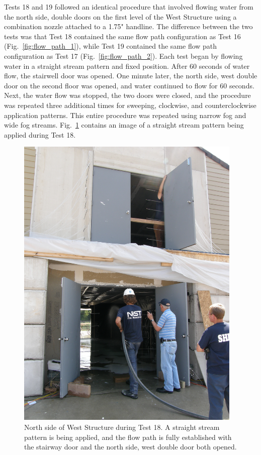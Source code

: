 \documentclass[12pt,oneside]{book}
\begin{document}
Tests 18 and 19 followed an identical procedure that involved flowing water from the north side, double doors on the first level of the West Structure using a combination nozzle attached to a 1.75" handline. The difference between the two tests was that Test 18 contained the same flow path configuration as Test 16 (Fig.~\ref{fig:flow_path_1}), while Test 19 contained the same flow path configuration as Test 17 (Fig.~\ref{fig:flow_path_2}). Each test began by flowing water in a straight stream pattern and fixed position. After 60 seconds of water flow, the stairwell door was opened. One minute later, the north side, west double door on the second floor was opened, and water continued to flow for 60 seconds. Next, the water flow was stopped, the two doors were closed, and the procedure was repeated three additional times for sweeping, clockwise, and counterclockwise application patterns. This entire procedure was repeated using narrow fog and wide fog streams. Fig.~\ref{fig:test_18_pic} contains an image of a straight stream pattern being applied during Test 18.
\begin{figure}[!ht]
\includegraphics[width=4.25in]{../Pictures/Test_18}
\caption[North Side of West Structure during Test 18]{North side of West Structure during Test 18. A straight stream pattern is being applied, and the flow path is fully established with the stairway door and the north side, west double door both opened.}
\label{fig:test_18_pic}
\end{figure}
\clearpage
\end{document}
